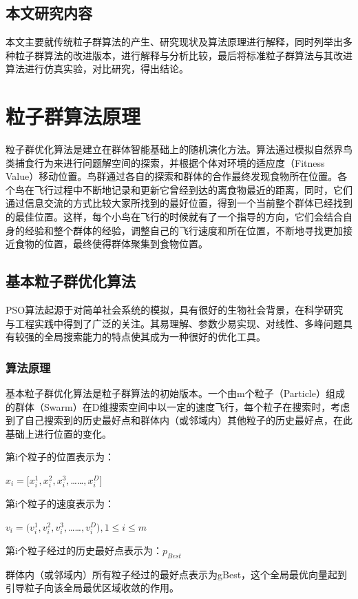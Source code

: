 \subsection{本文研究内容}
本文主要就传统粒子群算法的产生、研究现状及算法原理进行解释，同时列举出多种粒子群算法的改进版本，进行解释与分析比较，最后将标准粒子群算法与其改进算法进行仿真实验，对比研究，得出结论。
\section{粒子群算法原理}
粒子群优化算法是建立在群体智能基础上的随机演化方法。算法通过模拟自然界鸟类捕食行为来进行问题解空间的探索，并根据个体对环境的适应度（Fitness Value）移动位置。鸟群通过各自的探索和群体的合作最终发现食物所在位置。各个鸟在飞行过程中不断地记录和更新它曾经到达的离食物最近的距离，同时，它们通过信息交流的方式比较大家所找到的最好位置，得到一个当前整个群体已经找到的最佳位置。这样，每个小鸟在飞行的时候就有了一个指导的方向，它们会结合自身的经验和整个群体的经验，调整自己的飞行速度和所在位置，不断地寻找更加接近食物的位置，最终使得群体聚集到食物位置。

\subsection{基本粒子群优化算法}
PSO算法起源于对简单社会系统的模拟，具有很好的生物社会背景，在科学研究与工程实践中得到了广泛的关注。其易理解、参数少易实现、对线性、多峰问题具有较强的全局搜索能力的特点使其成为一种很好的优化工具。
\subsubsection{算法原理}
基本粒子群优化算法是粒子群算法的初始版本\cite{Shi1998A}。一个由m个粒子（Particle）组成的群体（Swarm）在D维搜索空间中以一定的速度飞行，每个粒子在搜索时，考虑到了自己搜索到的历史最好点和群体内（或邻域内）其他粒子的历史最好点，在此基础上进行位置的变化。

 \noindent 第i个粒子的位置表示为：
 
 \centerline{$x_i=[x_i^1,x_i^2,x_i^3,$……$,x_i^D]$}


 \noindent 第i个粒子的速度表示为：
 
 \centerline{$v_i=(v_i^1,v_i^2,v_i^3,$……$,v_i^D),1\leq i\leq m$} 

\noindent 第i个粒子经过的历史最好点表示为：$p_{Best}$

 群体内（或邻域内）所有粒子经过的最好点表示为gBest，这个全局最优向量起到引导粒子向该全局最优区域收敛的作用。

